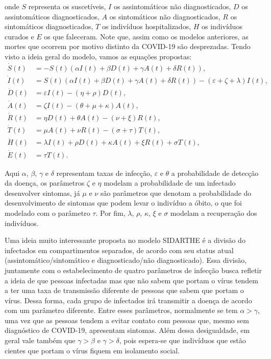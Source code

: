\documentclass{article}
\begin{document}
	\noindent onde $S$ representa os suscetíveis, $I$ os assintomáticos não diagnosticados, $D$ os assintomáticos diagnosticados, $A$ os sintomáticos não diagnosticados, $R$ os sintomáticos diagnosticados, $T$ os indivíduos hospitalizados, $H$ os indivíduos curados e $E$ os que faleceram. Note que, assim como os modelos anteriores, as mortes que ocorrem por motivo distinto da COVID-19 são desprezadas. Tendo visto a ideia geral do modelo, vamos as equações propostas:
	\begin{equation*}
		\begin{split}
			\dot{S}(t) & = -S(t)(\alpha I(t) + \beta D(t) + \gamma A(t) + \delta R(t)),\\
			\dot{I}(t) & = S(t)(\alpha I(t) + \beta D(t) + \gamma A(t) + \delta R(t)) - (\varepsilon + \zeta + \lambda)I(t), \\
			\dot{D}(t) & = \varepsilon I(t) - (\eta + \rho)D(t), \\
			\dot{A}(t) & = \zeta I(t) - (\theta + \mu + \kappa)A(t), \\
			\dot{R}(t) & = \eta D(t) + \theta A(t) - (\nu + \xi)R(t), \\
			\dot{T}(t) & = \mu A(t) + \nu R(t) - (\sigma + \tau)T(t), \\
			\dot{H}(t) & = \lambda I(t) + \rho D(t) + \kappa A(t) + \xi R(t) + \sigma T(t), \\
			\dot{E}(t) & = \tau T(t).
		\end{split}
	\end{equation*}
	
	Aqui $\alpha$, $\beta$, $\gamma$ e $\delta$ representam taxas de infecção, $\varepsilon$ e $\theta$ a probabilidade de detecção da doença, os parâmetros $\zeta$ e $\eta$ modelam a probabilidade de um infectado desenvolver sintomas, já $\mu$ e $\nu$ são parâmetros que denotam a probabilidade do desenvolvimento de sintomas que podem levar o indivíduo a óbito, o que foi modelado com o parâmetro $\tau$. Por fim, $\lambda$, $\rho$, $\kappa$, $\xi$ e $\sigma$ modelam a recuperação dos indivíduos.
	
	Uma ideia muito interessante proposta no modelo SIDARTHE é a divisão do infectados em compartimentos separados, de acordo com seu status atual (assintomático/sintomático e diagnosticado/não diagnosticado). Essa divisão, juntamente com o estabelecimento de quatro parâmetros de infecção busca refletir a ideia de que pessoas infectadas mas que não sabem que portam o vírus tendem a ter uma taxa de transmissão diferente de pessoas que sabem que portam o vírus. Dessa forma, cada grupo de infectados irá transmitir a doença de acordo com um parâmetro diferente. Entre esses parâmetros, normalmente se tem $\alpha > \gamma$, uma vez que as pessoas tendem a evitar contato com pessoas que, mesmo sem diagnóstico de COVID-19, apresentam sintomas. Além dessa desigualdade, em geral vale também que $\gamma > \beta$ e $\gamma > \delta$, pois espera-se que indivíduos que estão cientes que portam o vírus fiquem em isolamento social.
	
\end{document}
